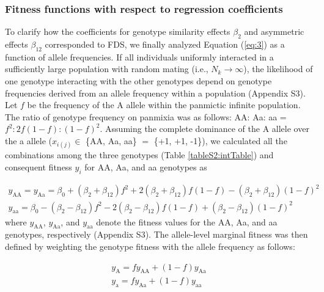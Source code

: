 \documentclass[12pt,]{article}
\begin{document}
\subsubsection{Fitness functions with respect to regression coefficients}
To clarify how the coefficients for genotype similarity effects $\beta_2$ and asymmetric effects $\beta_{12}$ corresponded to FDS, we finally analyzed Equation (\ref{eq:3}) as a function of allele frequencies. If all individuals uniformly interacted in a sufficiently large population with random mating (i.e., $N_k \to \infty$), the likelihood of one genotype interacting with the other genotypes depend on genotype frequencies derived from an allele frequency within a population (Appendix S3). Let $f$ be the frequency of the A allele within the panmictic infinite population. The ratio of genotype frequency on panmixia was as follows: AA: Aa: aa = $f^2:2f(1-f):(1-f)^2$. Assuming the complete dominance of the A allele over the a allele ($x_{i(j)} \in$ \{AA, Aa, aa\} $=$ \{+1, +1, -1\}), we calculated all the combinations among the three genotypes (Table \ref{tableS2:intTable}) and consequent fitness $y_i$ for AA, Aa, and aa genotypes as

\begin{subequations}
\begin{align}
y_\mathrm{AA} = y_\mathrm{Aa} = \beta_0 + (\beta_2 + \beta_{12})f^2 + 2(\beta_2 + \beta_{12}) f(1-f) - (\beta_2 + \beta_{12})(1-f)^2 \label{eq:4a} \\
y_\mathrm{aa} = \beta_0 - (\beta_2 - \beta_{12}) f^2 - 2(\beta_2 - \beta_{12})f(1-f) + (\beta_2 - \beta_{12})(1-f)^2 \label{eq:4b}
\end{align}
\end{subequations}
\noindent
where $y_\mathrm{AA}$, $y_\mathrm{Aa}$, and $y_\mathrm{aa}$ denote the fitness values for the AA, Aa, and aa genotypes, respectively (Appendix S3). The allele-level marginal fitness was then defined by weighting the genotype fitness with the allele frequency as follows:

\begin{subequations}
\begin{align}
y_\mathrm{A} = f y_\mathrm{AA} + (1 - f) y_\mathrm{Aa} \label{eq:5a} \\
y_\mathrm{a} = f y_\mathrm{Aa} + (1 - f) y_\mathrm{aa} \label{eq:5b}
\end{align}
\end{subequations}
\end{document}
